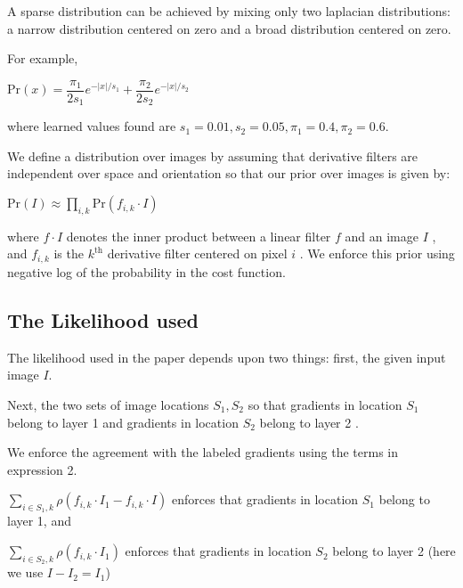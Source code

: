\documentclass[fleqn, 11pt]{article}
\begin{document}
A sparse distribution can be achieved by mixing only two laplacian
distributions: a narrow distribution centered on zero and a broad distribution centered on zero. 

\smallskip

For example, 

\begin{center}
    $\text{Pr}(x) = \dfrac{\pi_1}{2s_1}e^{-|x|/s_1} + \dfrac{\pi_2}{2s_2}e^{-|x|/s_2}     $  \\
\end{center}
    where learned values  found are $ s_1 = 0.01, s_2 = 0.05, \pi_1 = 0.4, \pi_2 = 0.6 $.

\medskip

We define a distribution over
images by assuming that derivative filters are independent over space and orientation so that our prior
over images is given by:
\begin{center}
    $\text{Pr}(I) \approx \displaystyle  \prod_{i,k} \text{Pr}(f_{i,k} \cdot I)  $
\end{center}
where  $f \cdot I$ denotes the inner product between a linear filter $f$ and an image $I$ , 
and $f_{i,k} $ is the $k^{\text{th}}$
derivative filter centered on pixel $i$ . We enforce this prior using negative log of the probability in the cost function.


\subsection*{The Likelihood used}

The likelihood used in the paper depends upon two things: first, the given input image $I$.

\smallskip

Next, the two sets of image
locations $S_1, S_2$ so that gradients in location $S_1$ belong to layer 1 and 
gradients in location $S_2$ belong to layer 2 .

\smallskip

We enforce the agreement with the labeled gradients using the terms in expression 2. 

\medskip

$\displaystyle \sum_{i \in S_1,k} \rho(f_{i,k} \cdot I_1 -  f_{i,k} \cdot I ) $ enforces that  gradients in location $S_1$ belong to layer 1,
and 

\medskip

$ \displaystyle \sum_{i \in S_2,k} \rho(f_{i,k} \cdot I_1 )   $ enforces that  gradients in location $S_2$ belong to layer 2 (here we use $I-I_2=I_1$)
\end{document}
